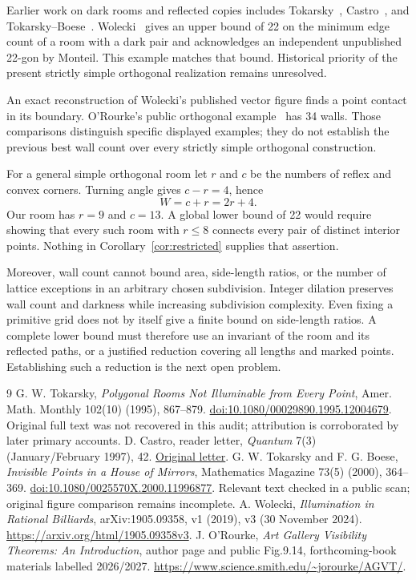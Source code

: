 \documentclass[11pt]{article}
\theoremstyle{definition}\newtheorem{definition}[theorem]{Definition}
\begin{document}
Earlier work on dark rooms and reflected copies includes Tokarsky~\cite{tokarsky}, Castro~\cite{castro}, and Tokarsky--Boese~\cite{boese}. Wolecki~\cite{wolecki} gives an upper bound of 22 on the minimum edge count of a room with a dark pair and acknowledges an independent unpublished 22-gon by Monteil. This example matches that bound. Historical priority of the present strictly simple orthogonal realization remains unresolved.

An exact reconstruction of Wolecki's published vector figure finds a point contact in its boundary. O'Rourke's public orthogonal example~\cite{orourke} has 34 walls. Those comparisons distinguish specific displayed examples; they do not establish the previous best wall count over every strictly simple orthogonal construction.

For a general simple orthogonal room let $r$ and $c$ be the numbers of reflex and convex corners. Turning angle gives $c-r=4$, hence
\[
 W=c+r=2r+4.
\]
Our room has $r=9$ and $c=13$. A global lower bound of 22 would require showing that every such room with $r\le8$ connects every pair of distinct interior points. Nothing in Corollary~\ref{cor:restricted} supplies that assertion.

Moreover, wall count cannot bound area, side-length ratios, or the number of lattice exceptions in an arbitrary chosen subdivision. Integer dilation preserves wall count and darkness while increasing subdivision complexity. Even fixing a primitive grid does not by itself give a finite bound on side-length ratios. A complete lower bound must therefore use an invariant of the room and its reflected paths, or a justified reduction covering all lengths and marked points. Establishing such a reduction is the next open problem.

\clearpage
\begin{thebibliography}{9}\small
{} G. W. Tokarsky, \emph{Polygonal Rooms Not Illuminable from Every Point}, Amer. Math. Monthly 102(10) (1995), 867--879. \href{https://doi.org/10.1080/00029890.1995.12004679}{doi:10.1080/00029890.1995.12004679}. Original full text was not recovered in this audit; attribution is corroborated by later primary accounts.
 D. Castro, reader letter, \emph{Quantum} 7(3) (January/February 1997), 42. \href{https://static.nsta.org/pdfs/QuantumV7N3.pdf\#page=44}{Original letter}.
 G. W. Tokarsky and F. G. Boese, \emph{Invisible Points in a House of Mirrors}, Mathematics Magazine 73(5) (2000), 364--369. \href{https://doi.org/10.1080/0025570X.2000.11996877}{doi:10.1080/0025570X.2000.11996877}. Relevant text checked in a public scan; original figure comparison remains incomplete.
 A. Wolecki, \emph{Illumination in Rational Billiards}, arXiv:1905.09358, v1 (2019), v3 (30 November 2024). \url{https://arxiv.org/html/1905.09358v3}.
 J. O'Rourke, \emph{Art Gallery Visibility Theorems: An Introduction}, author page and public Fig.9.14, forthcoming-book materials labelled 2026/2027. \url{https://www.science.smith.edu/~jorourke/AGVT/}.
\end{thebibliography}
\end{document}
